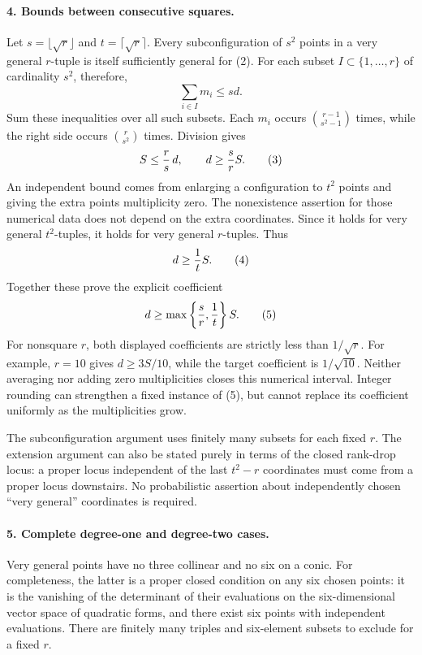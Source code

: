 \documentclass[11pt]{article}
\begin{document}
\paragraph{4. Bounds between consecutive squares.}
Let $s=\lfloor\sqrt r\rfloor$ and $t=\lceil\sqrt r\rceil$. Every subconfiguration of $s^2$ points in a very general $r$-tuple is itself sufficiently general for (2). For each subset $I\subset\{1,\ldots,r\}$ of cardinality $s^2$, therefore,
\[
 \sum_{i\in I}m_i\le sd.
\]
Sum these inequalities over all such subsets. Each $m_i$ occurs $\binom{r-1}{s^2-1}$ times, while the right side occurs $\binom r{s^2}$ times. Division gives
\[
 S\le {r\over s}\,d,\qquad d\ge {s\over r}S.            \tag{3}
\]
An independent bound comes from enlarging a configuration to $t^2$ points and giving the extra points multiplicity zero. The nonexistence assertion for those numerical data does not depend on the extra coordinates. Since it holds for very general $t^2$-tuples, it holds for very general $r$-tuples. Thus
\[
 d\ge {1\over t}S.                                    \tag{4}
\]
Together these prove the explicit coefficient
\[
 d\ge \max\left\{{s\over r},{1\over t}\right\}S.         \tag{5}
\]
For nonsquare $r$, both displayed coefficients are strictly less than $1/\sqrt r$. For example, $r=10$ gives $d\ge3S/10$, while the target coefficient is $1/\sqrt{10}$. Neither averaging nor adding zero multiplicities closes this numerical interval. Integer rounding can strengthen a fixed instance of (5), but cannot replace its coefficient uniformly as the multiplicities grow.

The subconfiguration argument uses finitely many subsets for each fixed $r$. The extension argument can also be stated purely in terms of the closed rank-drop locus: a proper locus independent of the last $t^2-r$ coordinates must come from a proper locus downstairs. No probabilistic assertion about independently chosen ``very general'' coordinates is required.

\paragraph{5. Complete degree-one and degree-two cases.}
Very general points have no three collinear and no six on a conic. For completeness, the latter is a proper closed condition on any six chosen points: it is the vanishing of the determinant of their evaluations on the six-dimensional vector space of quadratic forms, and there exist six points with independent evaluations. There are finitely many triples and six-element subsets to exclude for a fixed $r$.
\end{document}
